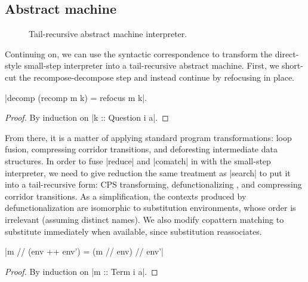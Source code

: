 \documentclass[sigplan,screen]{acmart}
\begin{document}
\subsection{Abstract machine}

\begin{figure}
\centering
{}
\caption{Tail-recursive abstract machine interpreter.}
\label{fig:block-machine-code}
\end{figure}

Continuing on, we can use the syntactic correspondence to transform the
direct-style small-step interpreter into a tail-recursive abstract machine.
First, we short-cut the recompose-decompose step and instead continue by
refocusing in place.
\begin{lemma}
  \label{thm:block-refocusing}

  \hs|decomp (recomp m k) = refocus m k|.
\end{lemma}
\begin{proof}
  By induction on \hs|k :: Question i a|.
\end{proof}
From there, it is a matter of applying standard program transformations: loop
fusion, compressing corridor transitions, and deforesting intermediate data
structures.  In order to fuse \hs|reduce| and \hs|comatch| in with the
small-step interpreter, we need to give reduction the same treatment as
\hs|search| to put it into a tail-recursive form: CPS transforming,
defunctionalizing \cite{DefinitionalInterpreters}, and compressing corridor
transitions.  As a simplification, the contexts produced by defunctionalization
are isomorphic to substitution environments, whose order is irrelevant (assuming
distinct names).  We also modify copattern matching to substitute immediately
when available, since substitution reassociates.
\begin{lemma}
  \label{thm:block-subst-reassoc}
  \hs|m // (env ++ env') = (m // env) // env'|
\end{lemma}
\begin{proof}
  By induction on \hs|m :: Term i a|.
\end{proof}
\end{document}

